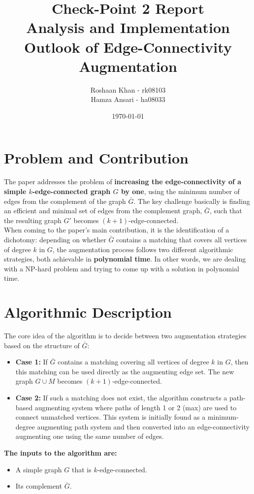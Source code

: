 \documentclass[12pt]{article}
\title{\textbf{Check-Point 2 Report} \\ Analysis and Implementation Outlook of Edge-Connectivity Augmentation}
\author{Roshaan Khan - rk08103 \\ Hamza Ansari - ha08033}
\date{\today}
\begin{document}
\maketitle

\section*{Problem and Contribution}
The paper addresses the problem of \textbf{increasing the edge-connectivity of a simple $k$-edge-connected graph $G$ by one}, using the minimum number of edges from the complement of the graph $\bar{G}$. The key challenge basically is finding an efficient and minimal set of edges from the complement graph, $\bar{G}$, such that the resulting graph $G'$ becomes $(k+1)$-edge-connected.\\ When coming to the paper's main contribution, it is the identification of a dichotomy: depending on whether $\bar{G}$ contains a matching that covers all vertices of degree $k$ in $G$, the augmentation process follows two different algorithmic strategies, both achievable in \textbf{polynomial time}. In other words, we are dealing with a NP-hard problem and trying to come up with a solution in polynomial time.

\section*{Algorithmic Description}
The core idea of the algorithm is to decide between two augmentation strategies based on the structure of $\bar{G}$:

\begin{itemize}
    \item \textbf{Case 1:} If $\bar{G}$ contains a matching covering all vertices of degree $k$ in $G$, then this matching can be used directly as the augmenting edge set. The new graph $G \cup M$ becomes $(k+1)$-edge-connected.
    \item \textbf{Case 2:} If such a matching does not exist, the algorithm constructs a path-based augmenting system where paths of length 1 or 2 (max) are used to connect unmatched vertices. This system is initially found as a minimum-degree augmenting path system and then converted into an edge-connectivity augmenting one using the same number of edges.
\end{itemize}

\textbf{The inputs to the algorithm are:}
\begin{itemize}
    \item A simple graph $G$ that is $k$-edge-connected.
    \item Its complement $\bar{G}$.
\end{itemize}
\end{document}
